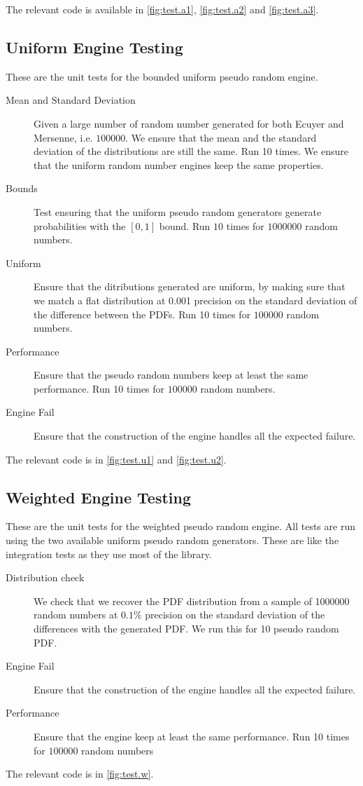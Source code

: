 \documentclass[12pt,a4paper,titlepage]{article}
\begin{document}
The relevant code is available in \autoref{fig:test.a1}, \autoref{fig:test.a2}
and \autoref{fig:test.a3}.

\subsection{Uniform Engine Testing} 

These are the unit tests for the bounded uniform pseudo random engine.
	
\begin{description}
	\item [Mean and Standard Deviation]
		Given a large number of random number generated for
		both Ecuyer and Mersenne, i.e. $100000$.
		We ensure that the mean and the standard deviation 
		of the distributions are still the same. Run 10 times.
		We ensure that the uniform random number engines keep
		the same properties.
	\item [Bounds]
		Test ensuring that the uniform pseudo random generators
		generate probabilities with the $[0, 1]$ bound.
		Run $10$ times for $1000000$ random numbers.
	\item [Uniform]
		Ensure that the ditributions generated are uniform,
		by making sure that we match a flat distribution at 0.001
		precision on the standard deviation of the difference
		between the PDFs.
		Run 10 times for $100000$ random numbers.
	\item [Performance]
		Ensure that the pseudo random numbers keep at
		least the same performance.
		Run 10 times for $100000$ random numbers.
	\item [Engine Fail]
		Ensure that the construction of the engine 
		handles all the expected failure.
\end{description}
The relevant code is in \autoref{fig:test.u1} and \autoref{fig:test.u2}.
\subsection{Weighted Engine Testing} 
These are the unit tests for the weighted pseudo random engine.
All tests are run using the two available uniform pseudo random
generators. 
These are like the integration tests as they use most of the library.
\begin{description}
	\item [Distribution check]
		We check that we recover the PDF distribution from
		a sample of 1000000 random numbers at $0.1\%$ precision
		on the standard deviation of the differences with the 
		generated PDF.
		We run this for 10 pseudo random PDF.
	\item [Engine Fail]
		Ensure that the construction of the engine 
		handles all the expected failure.
	\item [Performance]
		Ensure that the engine keep at least the same performance.
		Run 10 times for $100000$ random  numbers	
\end{description}	
The relevant code is in \autoref{fig:test.w}.
\end{document}
